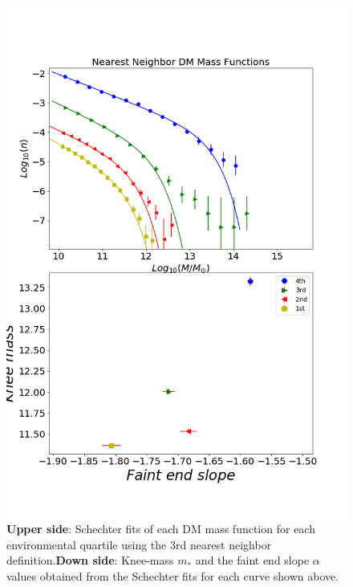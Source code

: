 \documentclass[a4paper,fleqn,usenatbib]{mnras}
\begin{document}
\begin{figure}
	\includegraphics[width=\columnwidth]{./pics/quartilesDM.png}
    \caption{\textbf{Upper side}: Schechter fits of each DM mass
      function for each environmental quartile using the 3rd nearest
      neighbor definition.\textbf{Down side}: Knee-mass $m_\ast$ and
      the faint end slope $\alpha$ values obtained from the Schechter
      fits for each curve shown above.} 
    \label{fig:quartilesDM}
\end{figure}
\end{document}
